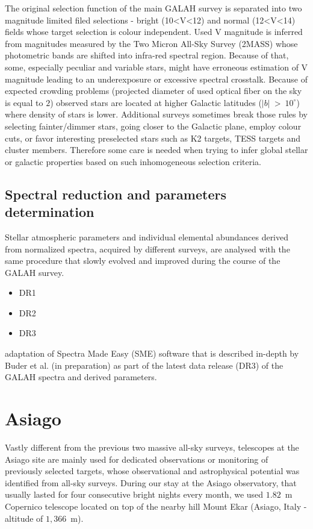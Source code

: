 The original selection function of the main GALAH survey is separated into two magnitude limited filed selections - bright (10<V<12) and normal (12<V<14) fields whose target selection is colour independent. Used V magnitude is inferred from magnitudes measured by the Two Micron All-Sky Survey (2MASS) \citep{2006AJ....131.1163S} whose photometric bands are shifted into infra-red spectral region. Because of that, some, especially peculiar and variable stars, might have erroneous estimation of V magnitude leading to an underexposure or excessive spectral crosstalk. Because of expected crowding problems (projected diameter of used optical fiber on the sky is equal to $2$\arcsec) observed stars are located at higher Galactic latitudes ($|b|$~>~$10^\circ$) where density of stars is lower. Additional surveys sometimes break those rules by selecting fainter/dimmer stars, going closer to the Galactic plane, employ colour cuts, or favor interesting preselected stars such as K2 \citep{2014PASP..126..398H} targets, TESS \citep{2015JATIS...1a4003R} targets and cluster members. Therefore some care is needed when trying to infer global stellar or galactic properties based on such inhomogeneous selection criteria.

\subsection{Spectral reduction and parameters determination}
Stellar atmospheric parameters and individual elemental abundances derived from normalized spectra, acquired by different surveys, are analysed with the same procedure that slowly evolved and improved during the course of the GALAH survey.

\begin{itemize}
	\item DR1
	\item DR2
	\item DR3
\end{itemize}


adaptation of Spectra Made Easy (SME) \citep{1996A&AS..118..595V, 2017A&A...597A..16P} software that is described in-depth by Buder et al. (in preparation) as part of the latest data release (DR3) of the GALAH spectra and derived parameters.


\section{Asiago}
\label{sec:asiago_data}
Vastly different from the previous two massive all-sky surveys, telescopes at the Asiago site are mainly used for dedicated observations or monitoring of previously selected targets, whose observational and astrophysical potential was identified from all-sky surveys. During our stay at the Asiago observatory, that usually lasted for four consecutive bright nights every month, we used $1.82$~m Copernico telescope located on top of the nearby hill Mount Ekar (Asiago, Italy - altitude of $1,366$~m).

